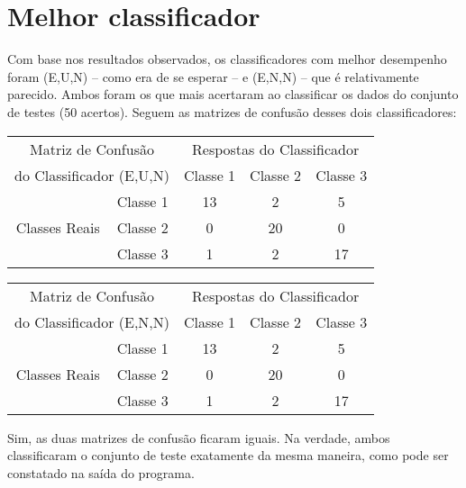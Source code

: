 \documentclass[a4paper,11pt]{article}
\begin{document}
\section{Melhor classificador}

  Com base nos resultados observados, os classificadores com melhor desempenho
  foram (E,U,N) -- como era de se esperar -- e (E,N,N) -- que é relativamente
  parecido. Ambos foram os que mais acertaram ao classificar os dados do
  conjunto de testes (50 acertos). Seguem as matrizes de confusão desses dois
  classificadores:
  
  \vspace{12pt}
  
  \begin{tabular}{|cc|c|c|c|}
    \hline
    \multicolumn{2}{|c|}{Matriz de Confusão} &  
    \multicolumn{3}{|c|}{Respostas do Classificador} \\
    \cline{3-5}
    \multicolumn{2}{|c|}{do Classificador (E,U,N)}
    & Classe 1 & Classe 2 & Classe 3 \\
    \hline
    \multirow{3}{*}{Classes Reais}
    & \multicolumn{1}{|c|}{Classe 1} & 13 &  2 &  5 \\
    \cline{3-5}
    & \multicolumn{1}{|c|}{Classe 2} &  0 & 20 &  0 \\
    \cline{3-5}
    & \multicolumn{1}{|c|}{Classe 3} &  1 &  2 & 17 \\
    \hline
  \end{tabular}
  
  \begin{tabular}{|cc|c|c|c|}
    \hline
    \multicolumn{2}{|c|}{Matriz de Confusão} &  
    \multicolumn{3}{|c|}{Respostas do Classificador} \\
    \cline{3-5}
    \multicolumn{2}{|c|}{do Classificador (E,N,N)}
    & Classe 1 & Classe 2 & Classe 3 \\
    \hline
    \multirow{3}{*}{Classes Reais}
    & \multicolumn{1}{|c|}{Classe 1} & 13 &  2 &  5 \\
    \cline{3-5}
    & \multicolumn{1}{|c|}{Classe 2} &  0 & 20 &  0 \\
    \cline{3-5}
    & \multicolumn{1}{|c|}{Classe 3} &  1 &  2 & 17 \\
    \hline
  \end{tabular}
  
  \vspace{12pt}

  Sim, as duas matrizes de confusão ficaram iguais. Na verdade, ambos
  classificaram o conjunto de teste exatamente da mesma maneira, como pode ser
  constatado na saída do programa.
\end{document}
